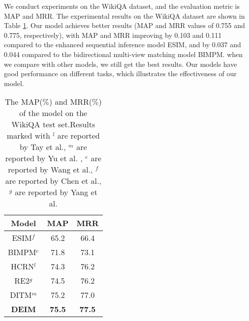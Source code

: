 \documentclass[review]{elsarticle}
\begin{document}
We conduct experiments on the WikiQA dataset, and the evaluation metric is MAP and MRR.
The experimental results on the WikiQA dataset are shown in Table \ref{tab:6}. Our model achieves better results (MAP and MRR values of 0.755 and 0.775, respectively), with MAP and MRR improving by 0.103 and 0.111 compared to the enhanced sequential inference model ESIM, and by 0.037 and 0.044 compared to the bidirectional multi-view matching model BIMPM. when we compare with other models, we still get the best results. Our models have good performance on different tasks, which illustrates the effectiveness of our model.
\begin{table}[htbp]
 \centering
  \caption{\label{tab:6}The MAP($\%$) and MRR($\%$) of the model on the WikiQA test set.Results marked with    $^l$ are reported by Tay et al.\cite{tay2018hermitian}, $^m$ are reported by Yu et al.\cite{yu2021simple} , $^e$ are reported by Wang et al.\cite{wang2017bilateral},  $^f$ are reported by Chen et al.\cite{chen2017enhanced}, $^g$ are reported by Yang et al.\cite{yang2019simple}}
\begin{tabular}{ccc}
 \toprule
Model & MAP & MRR\\
 \midrule

ESIM$^f$ & 65.2 & 66.4 \\
BIMPM$^e$ & 71.8 & 73.1 \\
HCRN$^l$ & 74.3 & 76.2 \\
RE2$^g$ & 74.5 & 76.2 \\
DITM$^m$ & 75.2 & 77.0 \\
\textbf{DEIM} & \textbf{75.5}&  \textbf{77.5} \\
\bottomrule
 \end{tabular}
\end{table}
\end{document}
